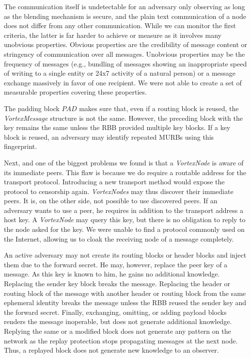 \documentclass[acmsmall, screen, review]{acmart}
\begin{document}
	The communication itself is undetectable for an adversary only observing as long as the blending mechanism is secure, and the plain text communication of a node does not differ from any other communication. While we can monitor the first criteria, the latter is far harder to achieve or measure as it involves many unobvious properties. Obvious properties are the credibility of message content or stringency of communication over all messages. Unobvious properties may be the frequency of messages (e.g., bundling of messages showing an inappropriate speed of writing to a single entity or 24x7 activity of a natural person) or a message exchange massively in favor of one recipient. We were not able to create a set of measurable properties covering these properties.
	
	The padding block $PAD$ makes sure that, even if a routing block is reused, the \emph{VortexMessage} structure is not the same. However, the preceding block with the key remains the same unless the RBB provided multiple key blocks. If a key block is reused, an adversary may identify repeated MURBs using this fingerprint.
	
	Next, and one of the biggest problems we found is that a \emph{VortexNode} is aware of its immediate peers. This flaw is because we do require a routable address for the transport protocol. Introducing a new transport method would expose the protocol to censorship again. \emph{VortexNodes} may thus discover their immediate peers. It is, on the other side, not possible to use discovered peers. If an adversary wants to use a peer, he requires in addition to the transport address a host key. A \emph{VortexNode} may query this key, but there is no obligation to reply to the node asked for the key. We were unable to find a protocol commonly used on the Internet, allowing us to cloak the receiving node of a message completely.
	
	An active adversary may not create its routing blocks or header blocks and inject them due to the forward secret. He may, however, replace the peer key of a message. As this key is known to him, he gains no additional knowledge. Replacing the sender key block breaks the message. Replacing the header or routing block of the message with another header or routing block from the same ephemeral identity breaks the message unless the RBB reused the sender key and the forward secret. Finally, exchanging, omitting, or adding payload blocks renders the message inoperable, but does not generate additional knowledge. Replying the same or a modified block does not generate any pattern on the network as the replay protection stops propagating messages at the next node. Thus, a replayed block does not generate new knowledge to an observer.
	
\end{document}

